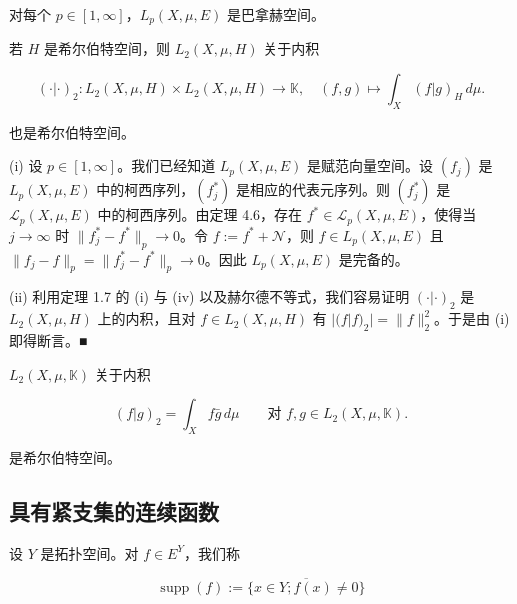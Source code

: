 \begin{theorem}

\begin{subitems}
\item

对每个 $ p \in [1, \infty] $，$ L_p(X, \mu, E) $ 是巴拿赫空间。

\item

若 $ H $ 是希尔伯特空间，则 $ L_2(X, \mu, H) $ 关于内积

\[
(\cdot|\cdot)_2 : L_2(X, \mu, H) \times L_2(X, \mu, H) \to \mathbb{K} , \quad (f, g) \mapsto \int_X (f|g)_H \, d\mu .
\]

也是希尔伯特空间。

\proofhead
(i) 设 $ p \in [1, \infty] $。我们已经知道 $ L_p(X, \mu, E) $ 是赋范向量空间。设 $ (f_j) $ 是 $ L_p(X, \mu, E) $ 中的柯西序列，$ (f_j^{*}) $ 是相应的代表元序列。则 $ (f_j^{*}) $ 是 $ \mathcal{L}_p(X, \mu, E) $ 中的柯西序列。由定理 4.6，存在 $ f^{*} \in \mathcal{L}_p(X, \mu, E) $，使得当 $ j \to \infty $ 时 $ \|f_j^{*} - f^{*}\|_p \to 0 $。令 $ f := f^{*} + \mathcal{N} $，则 $ f \in L_p(X, \mu, E) $ 且 $ \|f_j - f\|_p = \|f_j^{*} - f^{*}\|_p \to 0 $。因此 $ L_p(X, \mu, E) $ 是完备的。
\end{subitems}

(ii) 利用定理 1.7 的 (i) 与 (iv) 以及赫尔德不等式，我们容易证明 $ (\cdot|\cdot)_2 $ 是 $ L_2(X, \mu, H) $ 上的内积，且对 $ f \in L_2(X, \mu, H) $ 有 $ |(f|f)_2| = \|f\|_2^2 $。于是由 (i) 即得断言。\nobreak\hspace{0.35em}■

\end{theorem}

\begin{corollary}

$ L_2(X, \mu, \mathbb{K}) $ 关于内积

\[
(f|g)_2 = \int_X f \bar{g} \, d\mu \qquad \text{对 } f, g \in L_2(X, \mu, \mathbb{K}) .
\]

是希尔伯特空间。

\end{corollary}

\subsection*{具有紧支集的连续函数}

设 $ Y $ 是拓扑空间。对 $ f \in E^Y $，我们称

\[
\operatorname{supp}(f) := \overline{\{ x \in Y ; f(x) \ne 0 \}}
\]

